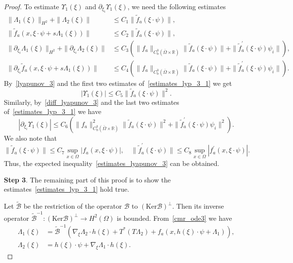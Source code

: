 \documentclass{elsarticle}
\begin{document}
\begin{proof}
To estimate $\Upsilon_1(\xi)$ and $\partial_{\xi_i}\Upsilon_1(\xi)$, we need the following estimates
\begin{equation}\label{estimates_lyp_3_1}
\begin{split}
	\| \Lambda_1(\xi)\|_{H^2} + \| \Lambda_2(\xi)\|&\leqslant C_1\|\tilde{f}_a(\xi\cdot\psi)\|,\\
	\|\tilde{f}_a(x, \xi\cdot\psi + s\Lambda_1(\xi))\|&\leqslant C_2 \|\tilde{f}_a(\xi\cdot\psi)\|,\\
	\|\partial_{\xi_i} \Lambda_1(\xi)\|_{H^2} + \| \partial_{\xi_i}\Lambda_2(\xi)\|&\leqslant C_3\left(\|f_a\|_{C^3_{\mathrm{b}}(\bar{\Omega}\times\mathbb{R})}\|\tilde{f}_a(\xi\cdot\psi)\| + \|\tilde{f}^{\prime}_a(\xi\cdot\psi)\psi_i \| \right), \\
	\|\partial_{\xi_i}\tilde{f}_a(x, \xi\cdot\psi + s\Lambda_1(\xi))\|&\leqslant C_4\left(\|f_a\|_{C^3_{\mathrm{b}}(\bar{\Omega}\times\mathbb{R})}\|\tilde{f}_a(\xi\cdot\psi)\| + \|\tilde{f}^{\prime}_a(\xi\cdot\psi)\psi_i \| \right).
\end{split}
\end{equation}
By~\eqref{lyapunov_3} and the first two estimates of~\eqref{estimates_lyp_3_1} we get
\[
|\Upsilon_1(\xi)| \leqslant C_5\|\tilde{f}_a(\xi\cdot\psi)\|^2.
\]
Similarly, by~\eqref{diff_lyapunov_3} and the last two estimates of~\eqref{estimates_lyp_3_1} we have
\[
|\partial_{\xi_i}\Upsilon_1(\xi)| \leqslant C_6\left(\|f_a\|^2_{C^3_{\mathrm{b}}(\bar{\Omega}\times\mathbb{R})}\|\tilde{f}_a(\xi\cdot\psi)\|^2 + \|\tilde{f}^{\prime}_a(\xi\cdot\psi)\psi_i \|^2 \right).
\]
We also note that
\begin{equation*}
	\|\tilde{f}_a(\xi\cdot\psi)\|\leqslant C_7\sup_{x\in\Omega}|f_a(x, \xi\cdot\psi)|,  \quad \|\tilde{f}^{\prime}_a(\xi\cdot\psi)\|\leqslant C_8 \sup_{x\in\Omega}|f^{\prime}_a(x, \xi\cdot\psi)|.
\end{equation*}
Thus, the expected inequality~\eqref{estimates_lyapunov_3} can be obtained.

\textbf{Step 3}. The remaining part of this proof is to show the estimates~\eqref{estimates_lyp_3_1} hold true. 

Let $\tilde{\mathcal{B}}$ be the restriction of the operator $\mathcal{B}$ to $(\mathrm{Ker}\mathcal{B})^{\bot}$. Then its inverse operator $\tilde{\mathcal{B}}^{-1}: (\mathrm{Ker}\mathcal{B})^{\bot}\rightarrow H^2(\Omega)$ is bounded. From~\eqref{cmr_ode3} we have
\begin{equation} \label{eq:lambdas}
\begin{split}
	\Lambda_1(\xi) &= \tilde{\mathcal{B}}^{-1}\left(\nabla_{\xi}\Lambda_2 \cdot h(\xi) + T^\ast(T\Lambda_2) + f_a(x, h(\xi)\cdot \psi + \Lambda_1)\right),\\
	\Lambda_2(\xi) &= h(\xi)\cdot \psi + \nabla_{\xi}\Lambda_1 \cdot h(\xi).
\end{split}
\end{equation}


\end{proof}
\end{document}
